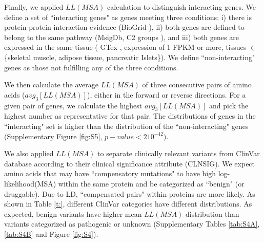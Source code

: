 
Finally, we applied $LL(MSA)$ calculation to distinguish interacting genes. We define a set of ``interacting genes" as genes meeting three conditions: i) there is protein-protein interaction evidence (BioGrid \cite{stark2006biogrid}), ii) both genes are defined to belong to the same pathway (MsigDb, C2 groups \cite{subramanian2005gene}), and iii) both genes are expressed in the same tissue ( GTex \cite{lonsdale2013genotype}, expression of 1 FPKM or more, tissues $\in$ \{skeletal muscle, adipose tissue, pancreatic Islets\}). We define ``non-interacting" genes as those not fulfilling any of the three conditions.

We then calculate the average $LL(MSA)$ of three consecutive pairs of amino acids ($avg_3[LL(MSA)]$), either in the forward or reverse directions. For a given pair of genes, we calculate the highest $avg_3[LL(MSA)]$ and pick the highest number as representative for that pair. The distributions of genes in the ``interacting" set is higher than the distribution of the  ``non-interacting" genes (Supplementary Figure \ref{fig:S5}, $p-value < 2 10^{-42})$.

We also applied $LL(MSA)$ to separate clinically relevant variants from ClinVar database \cite{landrum2013clinvar} according to their clinical significance attribute (CLNSIG). We expect amino acids that may have ``compensatory mutations" to have high log-likelihood(MSA) within the same protein and be categorized as ``benign" (or druggable). Due to LD, ``compensated pairs" within proteins are more likely. As shown in Table \ref{t:}, different ClinVar categories have different distributions. As expected, benign variants have higher mean $LL(MSA)$ distribution than variants categorized as pathogenic or unknown (Supplementary Tables \ref{tab:S4A}, \ref{tab:S4B} and Figure \ref{fig:S4}).


